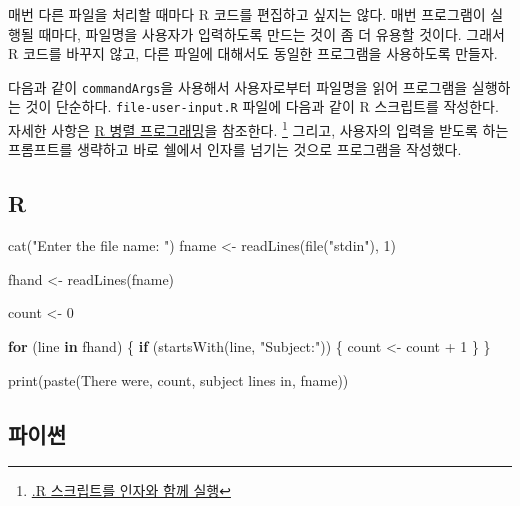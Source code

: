 \documentclass[
  letterpaper,
]{book}
\newenvironment{Shaded}{\begin{snugshade}}{\end{snugshade}}
\newcommand{\ControlFlowTok}[1]{\textcolor[rgb]{0.00,0.23,0.31}{\textbf{#1}}}
\newcommand{\DecValTok}[1]{\textcolor[rgb]{0.68,0.00,0.00}{#1}}
\newcommand{\FunctionTok}[1]{\textcolor[rgb]{0.28,0.35,0.67}{#1}}
\newcommand{\NormalTok}[1]{\textcolor[rgb]{0.00,0.23,0.31}{#1}}
\newcommand{\OtherTok}[1]{\textcolor[rgb]{0.00,0.23,0.31}{#1}}
\newcommand{\SpecialCharTok}[1]{\textcolor[rgb]{0.37,0.37,0.37}{#1}}
\newcommand{\StringTok}[1]{\textcolor[rgb]{0.13,0.47,0.30}{#1}}
\begin{document}
매번 다른 파일을 처리할 때마다 R 코드를 편집하고 싶지는 않다. 매번
프로그램이 실행될 때마다, 파일명을 사용자가 입력하도록 만드는 것이 좀 더
유용할 것이다. 그래서 R 코드를 바꾸지 않고, 다른 파일에 대해서도 동일한
프로그램을 사용하도록 만들자.

다음과 같이 \texttt{commandArgs}을 사용해서 사용자로부터 파일명을 읽어
프로그램을 실행하는 것이 단순하다. \texttt{file-user-input.R} 파일에
다음과 같이 R 스크립트를 작성한다. 자세한 사항은
\href{http://statkclee.github.io/parallel-r/}{R 병렬 프로그래밍}을
참조한다. \footnote{\href{http://statkclee.github.io/parallel-r/r-parallel-rscript-args.html}{.R
  스크립트를 인자와 함께 실행}} 그리고, 사용자의 입력을 받도록 하는
프롬프트를 생략하고 바로 쉘에서 인자를 넘기는 것으로 프로그램을
작성했다.

\subsection*{R}\label{r-38}

\begin{Shaded}
\begin{Highlighting}[]
\FunctionTok{cat}\NormalTok{(}\StringTok{"Enter the file name: "}\NormalTok{)}
\NormalTok{fname }\OtherTok{\textless{}{-}} \FunctionTok{readLines}\NormalTok{(}\FunctionTok{file}\NormalTok{(}\StringTok{"stdin"}\NormalTok{), }\DecValTok{1}\NormalTok{) }

\NormalTok{fhand }\OtherTok{\textless{}{-}} \FunctionTok{readLines}\NormalTok{(fname)}

\NormalTok{count }\OtherTok{\textless{}{-}} \DecValTok{0}

\ControlFlowTok{for}\NormalTok{ (line }\ControlFlowTok{in}\NormalTok{ fhand) \{}
  \ControlFlowTok{if}\NormalTok{ (}\FunctionTok{startsWith}\NormalTok{(line, }\StringTok{"Subject:"}\NormalTok{)) \{}
\NormalTok{    count }\OtherTok{\textless{}{-}}\NormalTok{ count }\SpecialCharTok{+} \DecValTok{1}
\NormalTok{  \}}
\NormalTok{\}}

\FunctionTok{print}\NormalTok{(}\FunctionTok{paste}\NormalTok{(}\StringTok{\textquotesingle{}There were\textquotesingle{}}\NormalTok{, count, }\StringTok{\textquotesingle{}subject lines in\textquotesingle{}}\NormalTok{, fname))}
\end{Highlighting}
\end{Shaded}

\subsection*{파이썬}\label{uxd30cuxc774uxc36c-38}
\end{document}

